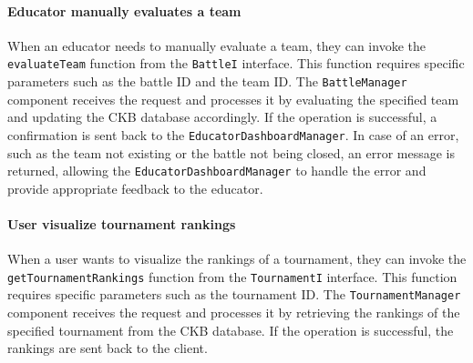 \paragraph{Educator manually evaluates a team}
When an educator needs to manually evaluate a team, they can invoke the \verb|evaluateTeam| function from the \verb|BattleI| interface. This function requires specific parameters such as the battle ID and the team ID.
The \verb|BattleManager| component receives the request and processes it by evaluating the specified team and updating the CKB database accordingly. If the operation is successful, a confirmation is sent back to the \verb|EducatorDashboardManager|.
In case of an error, such as the team not existing or the battle not being closed, an error message is returned, allowing the \verb|EducatorDashboardManager| to handle the error and provide appropriate feedback to the educator.

\paragraph{User visualize tournament rankings}
When a user wants to visualize the rankings of a tournament, they can invoke the \verb|getTournamentRankings| function from the \verb|TournamentI| interface. This function requires specific parameters such as the tournament ID.
The \verb|TournamentManager| component receives the request and processes it by retrieving the rankings of the specified tournament from the CKB database. If the operation is successful, the rankings are sent back to the client.

